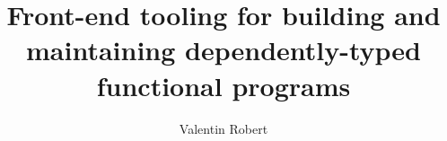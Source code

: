 \documentclass[12pt]{ucsddissertation}
\title{Front-end tooling for building and maintaining dependently-typed functional programs}
\author{Valentin Robert}
\begin{document}
\frontmatter
\maketitle
\makecopyright
\makesignature




\end{document}
